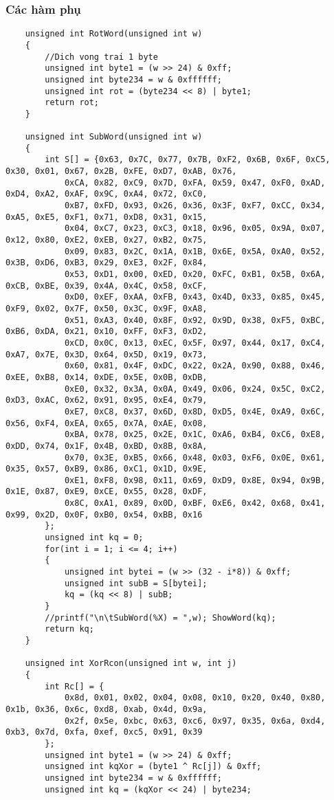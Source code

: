 \subsubsection{Các hàm phụ}
\begin{verbatim}
	unsigned int RotWord(unsigned int w)
	{
		//Dich vong trai 1 byte
		unsigned int byte1 = (w >> 24) & 0xff;
		unsigned int byte234 = w & 0xffffff;
		unsigned int rot = (byte234 << 8) | byte1;
		return rot;
	}
	
	unsigned int SubWord(unsigned int w)
	{
		int S[] = {0x63, 0x7C, 0x77, 0x7B, 0xF2, 0x6B, 0x6F, 0xC5, 0x30, 0x01, 0x67, 0x2B, 0xFE, 0xD7, 0xAB, 0x76, 
			0xCA, 0x82, 0xC9, 0x7D, 0xFA, 0x59, 0x47, 0xF0, 0xAD, 0xD4, 0xA2, 0xAF, 0x9C, 0xA4, 0x72, 0xC0, 
			0xB7, 0xFD, 0x93, 0x26, 0x36, 0x3F, 0xF7, 0xCC, 0x34, 0xA5, 0xE5, 0xF1, 0x71, 0xD8, 0x31, 0x15, 
			0x04, 0xC7, 0x23, 0xC3, 0x18, 0x96, 0x05, 0x9A, 0x07, 0x12, 0x80, 0xE2, 0xEB, 0x27, 0xB2, 0x75, 
			0x09, 0x83, 0x2C, 0x1A, 0x1B, 0x6E, 0x5A, 0xA0, 0x52, 0x3B, 0xD6, 0xB3, 0x29, 0xE3, 0x2F, 0x84, 
			0x53, 0xD1, 0x00, 0xED, 0x20, 0xFC, 0xB1, 0x5B, 0x6A, 0xCB, 0xBE, 0x39, 0x4A, 0x4C, 0x58, 0xCF, 
			0xD0, 0xEF, 0xAA, 0xFB, 0x43, 0x4D, 0x33, 0x85, 0x45, 0xF9, 0x02, 0x7F, 0x50, 0x3C, 0x9F, 0xA8, 
			0x51, 0xA3, 0x40, 0x8F, 0x92, 0x9D, 0x38, 0xF5, 0xBC, 0xB6, 0xDA, 0x21, 0x10, 0xFF, 0xF3, 0xD2, 
			0xCD, 0x0C, 0x13, 0xEC, 0x5F, 0x97, 0x44, 0x17, 0xC4, 0xA7, 0x7E, 0x3D, 0x64, 0x5D, 0x19, 0x73, 
			0x60, 0x81, 0x4F, 0xDC, 0x22, 0x2A, 0x90, 0x88, 0x46, 0xEE, 0xB8, 0x14, 0xDE, 0x5E, 0x0B, 0xDB, 
			0xE0, 0x32, 0x3A, 0x0A, 0x49, 0x06, 0x24, 0x5C, 0xC2, 0xD3, 0xAC, 0x62, 0x91, 0x95, 0xE4, 0x79, 
			0xE7, 0xC8, 0x37, 0x6D, 0x8D, 0xD5, 0x4E, 0xA9, 0x6C, 0x56, 0xF4, 0xEA, 0x65, 0x7A, 0xAE, 0x08, 
			0xBA, 0x78, 0x25, 0x2E, 0x1C, 0xA6, 0xB4, 0xC6, 0xE8, 0xDD, 0x74, 0x1F, 0x4B, 0xBD, 0x8B, 0x8A, 
			0x70, 0x3E, 0xB5, 0x66, 0x48, 0x03, 0xF6, 0x0E, 0x61, 0x35, 0x57, 0xB9, 0x86, 0xC1, 0x1D, 0x9E, 
			0xE1, 0xF8, 0x98, 0x11, 0x69, 0xD9, 0x8E, 0x94, 0x9B, 0x1E, 0x87, 0xE9, 0xCE, 0x55, 0x28, 0xDF, 
			0x8C, 0xA1, 0x89, 0x0D, 0xBF, 0xE6, 0x42, 0x68, 0x41, 0x99, 0x2D, 0x0F, 0xB0, 0x54, 0xBB, 0x16
		};
		unsigned int kq = 0;
		for(int i = 1; i <= 4; i++)	
		{
			unsigned int bytei = (w >> (32 - i*8)) & 0xff;
			unsigned int subB = S[bytei];
			kq = (kq << 8) | subB;
		}
		//printf("\n\tSubWord(%X) = ",w); ShowWord(kq);
		return kq;
	}
	
	unsigned int XorRcon(unsigned int w, int j)
	{     
		int Rc[] = {
			0x8d, 0x01, 0x02, 0x04, 0x08, 0x10, 0x20, 0x40, 0x80, 0x1b, 0x36, 0x6c, 0xd8, 0xab, 0x4d, 0x9a,
			0x2f, 0x5e, 0xbc, 0x63, 0xc6, 0x97, 0x35, 0x6a, 0xd4, 0xb3, 0x7d, 0xfa, 0xef, 0xc5, 0x91, 0x39
		};
		unsigned int byte1 = (w >> 24) & 0xff;
		unsigned int kqXor = (byte1 ^ Rc[j]) & 0xff;
		unsigned int byte234 = w & 0xffffff;
		unsigned int kq = (kqXor << 24) | byte234;
		

\end{verbatim}
